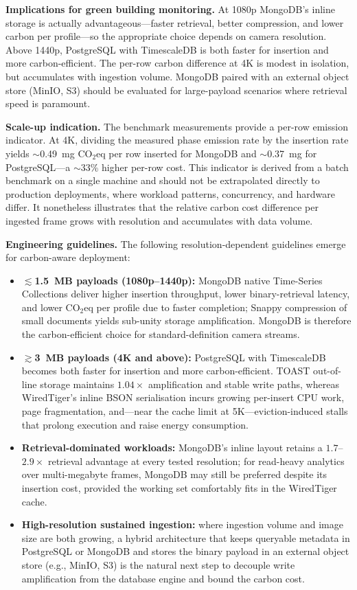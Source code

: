 \documentclass[conference]{IEEEtran}
\begin{document}
\textbf{Implications for green building monitoring.} At 1080p MongoDB's inline storage is actually advantageous---faster retrieval, better compression, and lower carbon per profile---so the appropriate choice depends on camera resolution. Above 1440p, PostgreSQL with TimescaleDB is both faster for insertion and more carbon-efficient. The per-row carbon difference at 4K is modest in isolation, but accumulates with ingestion volume. MongoDB paired with an external object store (MinIO, S3) should be evaluated for large-payload scenarios where retrieval speed is paramount.

\textbf{Scale-up indication.} The benchmark measurements provide a per-row emission indicator. At 4K, dividing the measured phase emission rate by the insertion rate yields $\sim$0.49~mg CO$_2$eq per row inserted for MongoDB and $\sim$0.37~mg for PostgreSQL---a $\sim$33\% higher per-row cost. This indicator is derived from a batch benchmark on a single machine and should not be extrapolated directly to production deployments, where workload patterns, concurrency, and hardware differ. It nonetheless illustrates that the relative carbon cost difference per ingested frame grows with resolution and accumulates with data volume.

\textbf{Engineering guidelines.} The following resolution-dependent guidelines emerge for carbon-aware deployment:
\begin{itemize}
    \item \textbf{$\lesssim$1.5~MB payloads (1080p--1440p):} MongoDB native Time-Series Collections deliver higher insertion throughput, lower binary-retrieval latency, and lower CO$_2$eq per profile due to faster completion; Snappy compression of small documents yields sub-unity storage amplification. MongoDB is therefore the carbon-efficient choice for standard-definition camera streams.
    \item \textbf{$\gtrsim$3~MB payloads (4K and above):} PostgreSQL with TimescaleDB becomes both faster for insertion and more carbon-efficient. TOAST out-of-line storage maintains $1.04\times$ amplification and stable write paths, whereas WiredTiger's inline BSON serialisation incurs growing per-insert CPU work, page fragmentation, and---near the cache limit at 5K---eviction-induced stalls that prolong execution and raise energy consumption.
    \item \textbf{Retrieval-dominated workloads:} MongoDB's inline layout retains a $1.7$--$2.9\times$ retrieval advantage at every tested resolution; for read-heavy analytics over multi-megabyte frames, MongoDB may still be preferred despite its insertion cost, provided the working set comfortably fits in the WiredTiger cache.
    \item \textbf{High-resolution sustained ingestion:} where ingestion volume and image size are both growing, a hybrid architecture that keeps queryable metadata in PostgreSQL or MongoDB and stores the binary payload in an external object store (e.g., MinIO, S3) is the natural next step to decouple write amplification from the database engine and bound the carbon cost.
\end{itemize}
\end{document}
